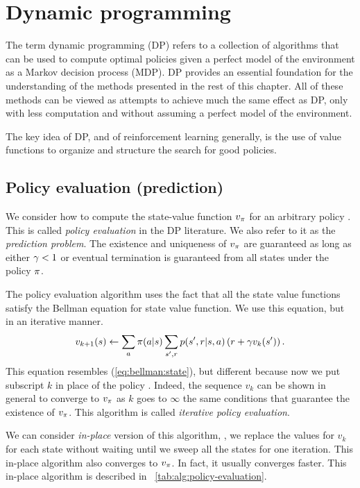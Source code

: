 \newpage
\section{Dynamic programming}

The term dynamic programming (DP)
refers to a collection of algorithms that
can be used to compute optimal policies given a perfect model of the environment as a Markov decision process (MDP).
DP provides an essential foundation for the understanding of the methods presented in the rest of this chapter.
All of these methods can be viewed as attempts to achieve much the same effect as DP,
only with less computation and without assuming a perfect model of the environment.

The key idea of DP, and of reinforcement learning generally, is the use of value functions to organize and structure the search for good policies.


\subsection{Policy evaluation (prediction)}

We consider how to compute the state-value function $v_{\pi}$ for an arbitrary policy \pol.
This is called \emph{policy evaluation} in the DP literature. We also refer to it as the \emph{prediction problem}.
The existence and uniqueness of $v_{\pi}$ are guaranteed as long as either $\gamma < 1$
or eventual termination is guaranteed from all states under the policy $\pi$.

The policy evaluation algorithm uses the fact that all the state value functions satisfy the Bellman equation for state value function.
We use this equation, but in an iterative manner.
\begin{equation}
v_{k+1}(s)
\leftarrow \sum_a \pi(a|s) \sum_{{s'}, r} p({s'}, r|s,a) \left( r + \gamma v_{k}({s'}) \right).
\end{equation}
This equation resembles (\ref{eq:bellman:state}), but different because now we put subscript $k$ in place of the policy \pol.
Indeed, the sequence $v_k$
can be shown in general to converge to $v_{\pi}$ as $k$ goes to $\infty$
the same conditions that guarantee the existence of $v_{\pi}$.
This algorithm is called \emph{iterative policy evaluation}.

We can consider \emph{in-place} version of this algorithm,
\ie, we replace the values for $v_k$ for each state without waiting until we sweep all the states for one iteration.
This in-place algorithm also converges to $v_{\pi}$.
In fact, it usually converges faster.
This in-place algorithm is described in \tablename~\ref{tab:alg:policy-evaluation}.

